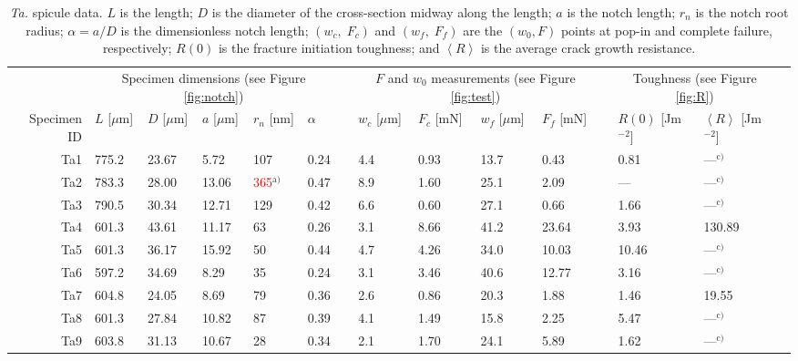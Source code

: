 \documentclass[12pt,onecolumn]{article}
\makeatletter
\newcommand{\TA}{\textit{Ta.\@}\xspace}
\newcommand{\ra}[1]{\renewcommand{\arraystretch}{#1}}
\makeatother
\begin{document}
\thispagestyle{empty}
\begin{landscape}

\begin{table}
{\scriptsize
\centering
\caption{\TA spicule data. $L$ is the length; $D$ is the diameter of the cross-section midway along the length; $a$ is the notch length; $r_n$ is the notch root radius; $\alpha=a/D$ is the dimensionless notch length; $(w_c,\;F_c)$ and $(w_f,\;F_f)$ are the $(w_0,F)$ points at pop-in and complete failure, respectively; $R(0)$ is the fracture initiation toughness; and $\left< R \right>$ is the average crack growth resistance.}
\label{tab:TAdata}
\ra{1.25}
\begin{threeparttable}
\begin{tabular}{rllllllllllllll}
\toprule
& \multicolumn{5}{c}{Specimen dimensions (see Figure \ref{fig:notch})} & & \multicolumn{4}{c}{$F$ and $w_0$ measurements (see Figure \ref{fig:test})} & & \multicolumn{2}{c}{Toughness (see Figure \ref{fig:R})} \\
\cmidrule{2-6} \cmidrule{8-11} \cmidrule{13-14}
Specimen ID & $L$ [$\mu$m] & $D$ [$\mu$m] & $a$ [$\mu$m] & $r_n$ [nm] & $\alpha$ & & $w_c$ [$\mu$m] & $F_c$ [mN] & $w_f$ [$\mu$m] & $F_f$ [mN] & & $R(0)$ [Jm$^{-2}$] & $\left< R \right>$ [Jm$^{-2}$] \\
\midrule
Ta1 & 775.2 & 23.67 & 5.72 &  107 & 0.24 &  &  4.4 & 0.93 & 13.7 & 0.43 &  & 0.81 &---$^\text{c)}$\\ 
Ta2 & 783.3 & 28.00 & 13.06 &  \textcolor{red}{365}$^\text{a)}$ & 0.47 &  &  8.9 & 1.60 & 25.1 & 2.09 &  & --- &---$^\text{c)}$\\ 
Ta3 & 790.5 & 30.34 & 12.71 &  129 & 0.42 &  &  6.6 & 0.60 & 27.1 & 0.66 &  & 1.66 &---$^\text{c)}$\\ 
Ta4 & 601.3 & 43.61 & 11.17 &   63 & 0.26 &  &  3.1 & 8.66 & 41.2 & 23.64 &  & 3.93 &130.89 \\ 
Ta5 & 601.3 & 36.17 & 15.92 &   50 & 0.44 &  &  4.7 & 4.26 & 34.0 & 10.03 &  & 10.46 &---$^\text{c)}$\\ 
Ta6 & 597.2 & 34.69 & 8.29 &   35 & 0.24 &  &  3.1 & 3.46 & 40.6 & 12.77 &  & 3.16 &---$^\text{c)}$\\ 
Ta7 & 604.8 & 24.05 & 8.69 &   79 & 0.36 &  &  2.6 & 0.86 & 20.3 & 1.88 &  & 1.46 &19.55 \\ 
Ta8 & 601.3 & 27.84 & 10.82 &   87 & 0.39 &  &  4.1 & 1.49 & 15.8 & 2.25 &  & 5.47 &---$^\text{c)}$\\ 
Ta9 & 603.8 & 31.13 & 10.67 &   28 & 0.34 &  &  2.1 & 1.70 & 24.1 & 5.89 &  & 1.62 &---$^\text{c)}$\\ 

\end{tabular}
\end{threeparttable}}
\end{table}
\end{landscape}
\end{document}
